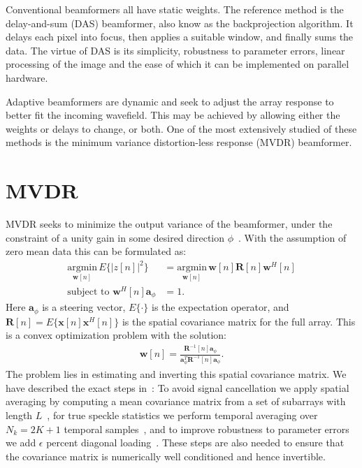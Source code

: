 \documentclass[10pt,journal,draftclsnofoot,onecolumn]{IEEEtran}
\newcommand\nn{\nonumber\\}
\newcommand\argmin[1]{\text{arg}\;\underset{#1}{\text{min}}}
\newcommand\T{^{\scriptscriptstyle T}}
\renewcommand\H{^{\scriptscriptstyle H}}
\renewcommand\vec[1]{\boldsymbol{#1}}
\newcommand\mat[1]{\boldsymbol{#1}}
\newcommand\1{\vec 1}
\renewcommand*\a{\vec a}
\newcommand*\w{\vec w}
\newcommand*\x{\vec x}
\newcommand*\R{\mat R}
\newcommand*\Ri{\R^{-1}}
\renewcommand\argmin{\text{argmin}}
\begin{document}
Conventional beamformers all have static weights. The reference method is the delay-and-sum (DAS) beamformer, also know as the backprojection algorithm. It delays each pixel into focus, then applies a suitable window, and finally sums the data. The virtue of DAS is its simplicity, robustness to parameter errors, linear processing of the image and the ease of which it can be implemented on parallel hardware.

Adaptive beamformers are dynamic and seek to adjust the array response to better fit the incoming wavefield. This may be achieved by allowing either the weights or delays to change, or both. One of the most extensively studied of these methods is the minimum variance distortion-less response (MVDR) beamformer.

\section{MVDR}\label{sec:mvdr}

MVDR seeks to minimize the output variance of the beamformer, under the constraint of a unity gain in some desired direction $\phi$~\cite{Capon1969}. With the assumption of zero mean data this can be formulated as: 
%
\begin{align}
\underset{\w[n]}{\argmin}\, E\{\big|z[n]\big|^2\} &= \underset{\w[n]}{\argmin}\, \w[n]\R[n]\w\H[n]\nn
\text{subject to } \w^H[n]\a_\phi &= 1.\label{eq:mvdr_definition}
\end{align}
%
Here $\a_\phi$ is a steering vector, $E\{\cdot\}$ is the expectation operator, and $\R[n] = E\{\x[n]\x\H[n]\}$ is the spatial covariance matrix for the full array. This is a convex optimization problem with the solution:
%
\begin{gather}
\vec w[n] = \frac{\Ri[n]\a_\phi}{\a_\phi\T\Ri[n]\a_\phi}.\label{eq:mvdr_weights}
\end{gather}
The problem lies in estimating and inverting this spatial covariance matrix. We have described the exact steps in~\cite{Buskenes2014}: To avoid signal cancellation we apply spatial averaging by computing a mean covariance matrix from a set of subarrays with length $L$~\cite{Kailath1985}, for true speckle statistics we perform temporal averaging over $N_k = 2K+1$ temporal samples~\cite{Synnevag2009a}, and to improve robustness to parameter errors we add {\large$\epsilon$} percent diagonal loading~\cite{Cox1987,Maksym1979}. These steps are also needed to ensure that the covariance matrix is numerically well conditioned and hence invertible.
\end{document}
